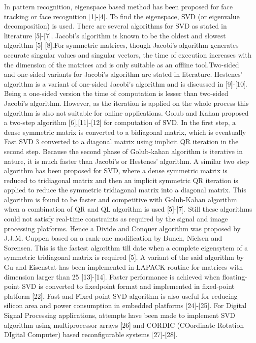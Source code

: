 In pattern recognition, eigenspace based method has been proposed for face
tracking or face recognition [1]-[4]. To find the eigenspace, SVD (or eigenvalue
decomposition) is used. There are several algorithms for SVD as stated in literature
[5]-[7]. Jacobi’s algorithm is known to be the oldest and slowest algorithm
[5]-[8].For symmetric matrices, though Jacobi’s algorithm generates accurate singular
values and singular vectors, the time of execution increases with the dimension
of the matrices and is only suitable as an offline tool.Two-sided and
one-sided variants for Jacobi’s algorithm are stated in literature. Hestenes’ algorithm
is a variant of one-sided Jacobi’s algorithm and is discussed in [9]-[10].
Being a one-sided version the time of computation is lesser than two-sided Jacobi’s
algorithm. However, as the iteration is applied on the whole process this
algorithm is also not suitable for online applications. Golub and Kahan proposed
a two-step algorithm [6],[11]-[12] for computation of SVD. In the first step, a
dense symmetric matrix is converted to a bidiagonal matrix, which is eventually
Fast SVD 3
converted to a diagonal matrix using implicit QR iteration in the second step.
Because the second phase of Golub-kahan algorithm is iterative in nature, it is
much faster than Jacobi’s or Hestenes’ algorithm. A similar two step algorithm
has been proposed for SVD, where a dense symmetric matrix is reduced to tridiagonal
matrix and then an implicit symmetric QR iteration is applied to reduce
the symmetric tridiagonal matrix into a diagonal matrix. This algorithm is found
to be faster and competitive with Golub-Kahan algorithm when a combination
of QR and QL algorithm is used [5]-[7]. Still these algorithms could not satisfy
real-time constraints as required by the signal and image processing platforms.
Hence a Divide and Conquer algorithm was proposed by J.J.M. Cuppen based on
a rank-one modification by Bunch, Nielsen and Sorensen. This is the fastest algorithm
till date when a complete eigensytem of a symmetric tridiagonal matrix is
required [5]. A variant of the said algorithm by Gu and Eisenstat has been implemented
in LAPACK routine for matrices with dimension larger than 25 [13]-[14].
Faster performance is achieved when floating-point SVD is converted to fixedpoint
format and implemented in fixed-point platform [22]. Fast and Fixed-point
SVD algorithm is also useful for reducing silicon area and power consumption
in embedded platforms [24]-[25]. For Digital Signal Processing applications, attempts
have been made to implement SVD algorithm using multiprocessor arrays
[26] and CORDIC (COordinate Rotation DIgital Computer) based reconfigurable
systems [27]-[28].\par
\par
\par

